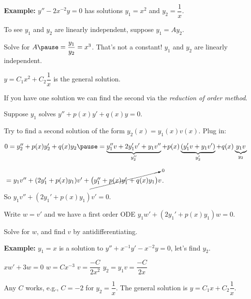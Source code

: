 \documentclass[10pt,aspectratio=169]{beamer}
\begin{document}
\begin{frame}
\textbf{Example:}
$y''-2x^{-2}y = 0$ has solutions $y_1 = x^2$ and $y_2 = \dfrac{1}{x}$.

\medskip
\pause

To see $y_1$ and $y_2$ are linearly independent, suppose
$y_1 = A y_2$.

\medskip
\pause

Solve for $A \pause = \dfrac{y_1}{y_2} = x^3$.
\pause
That's not a constant!
\pause \wthus $y_1$ and $y_2$ are linearly independent.

\medskip
\pause

\thus
\quad
$y = C_1 x^2 + C_2\dfrac{1}{x}$ \quad is the general solution.

\end{frame}

\begin{frame}
If you have one solution we can find the second
via the
\emph{reduction of order method}.

\medskip
\pause

Suppose $y_1$ solves
$y'' + p(x) y' + q(x) y = 0$.

\pause

Try to find a second solution of the form $y_2(x) = y_1(x) v(x)$.
\pause
Plug in:

\medskip

\quad
$
0 = y_2'' + p(x) y_2' + q(x) y_2
\pause
=
\underbrace{y_1'' v + 2 y_1' v' + y_1 v''}_{y_2''}
+ p(x) \underbrace{( y_1' v + y_1 v' )}_{y_2'}
+ q(x) \underbrace{y_1 v}_{y_2}$

\vspace*{-4pt}
\pause
\quad
\phantom{$0 = y_2'' + p(x) y_2' + q(x) y_2$}%
${} =
y_1 v''
+ (2 y_1' + p(x) y_1) v'
+
\cancelto{0}{\bigl( y_1'' + p(x) y_1' + q(x) y_1 \bigr)} v$.


\medskip
\pause

So
$y_1 v'' + (2 y_1' + p(x) y_1) v' = 0$.


\medskip
\pause

Write $w = v'$ and we have a first order ODE
\quad
$y_1 w' + (2 y_1' + p(x) y_1) w = 0$.

\medskip
\pause

Solve for $w$, and find $v$ by antidifferentiating.

\medskip
\pause

\textbf{Example:}
$y_1 = x$ is a solution to $y''+x^{-1}y'-x^{-2} y=0$, let's find $y_2$.

\medskip
\pause

\thus \quad $xw' + 3 w = 0$
\pause
\wthus
$w = Cx^{-3}$
\pause
\wthus
$v = \dfrac{-C}{2x^2}$
\pause
\wthus
$y_2 = y_1 v = \dfrac{-C}{2x}$

\medskip
\pause

Any $C$ works, e.g., $C=-2$ for $y_2 = \dfrac{1}{x}$.
\pause
\wthus
The general solution is \quad $y = C_1 x + C_2\dfrac{1}{x}$.

\end{frame}
\end{document}
